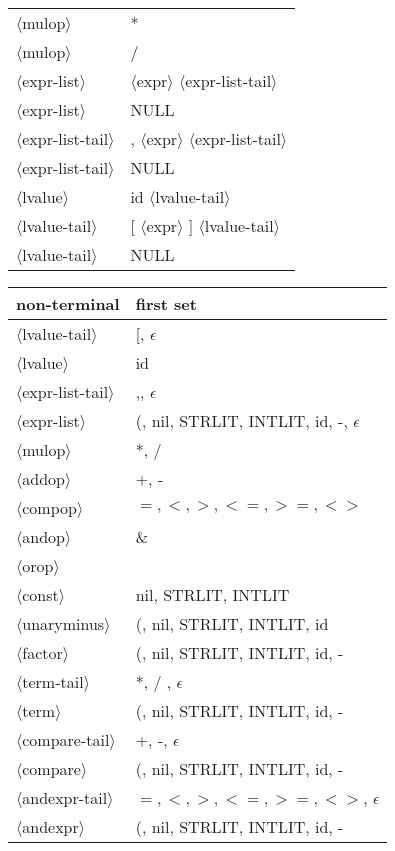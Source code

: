 \documentclass[11pt, fleqn]{article}
\newcommand{\atag}[1]{$\langle$#1$\rangle$}
\begin{document}
\begin{longtable}{l|l}
\atag{mulop}						&	*		\\
\atag{mulop}						&	/		\\
\atag{expr-list}					&	\atag{expr} \atag{expr-list-tail}		\\
\atag{expr-list}					&	NULL		\\
\atag{expr-list-tail}			&	, \atag{expr} \atag{expr-list-tail}		\\
\atag{expr-list-tail}			&	NULL		\\
\atag{lvalue}					&	id \atag{lvalue-tail}		\\
\atag{lvalue-tail}				&	[ \atag{expr} ] \atag{lvalue-tail}		\\
\atag{lvalue-tail}				&	NULL		\\
\end{longtable}


\begin{longtable}{l|l}
non-terminal						&	first set												\\
\hline
\atag{lvalue-tail}				&	[, $\epsilon$												\\
\atag{lvalue}					&	id														\\
\atag{expr-list-tail}			&	,, $\epsilon$												\\
\atag{expr-list}					&	(, nil, STRLIT, INTLIT, id, -, $\epsilon$				\\
\atag{mulop}						&	*, /														\\
\atag{addop}						&	+, -														\\
\atag{compop}					&	$=, <, >, <=, >=, <>$									\\
\atag{andop}						&	\&														\\
\atag{orop} 						&	\textbar		\\
\atag{const}						&	nil, STRLIT, INTLIT		\\
\atag{unaryminus}				&	(, nil, STRLIT, INTLIT, id		\\
\atag{factor}					&	(, nil, STRLIT, INTLIT, id, -		\\
\atag{term-tail}					&	*, /	, $\epsilon$	\\
\atag{term} 						&	(, nil, STRLIT, INTLIT, id, -		\\
\atag{compare-tail}				&	+, -, $\epsilon$	\\
\atag{compare} 					&	(, nil, STRLIT, INTLIT, id, -		\\
\atag{andexpr-tail}				&	$=, <, >, <=, >=, <>$, $\epsilon$	\\
\atag{andexpr} 					&	(, nil, STRLIT, INTLIT, id, -		\\

\end{longtable}
\end{document}
